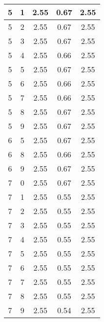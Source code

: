 \begin{longtable}{|c|c||c||c||c|}
	5 & 1 & 2.55 & 0.67 & 2.55 \\ \hline
	5 & 2 & 2.55 & 0.67 & 2.55 \\ \hline
	5 & 3 & 2.55 & 0.67 & 2.55 \\ \hline
	5 & 4 & 2.55 & 0.66 & 2.55 \\ \hline
	5 & 5 & 2.55 & 0.67 & 2.55 \\ \hline
	5 & 6 & 2.55 & 0.66 & 2.55 \\ \hline
	5 & 7 & 2.55 & 0.66 & 2.55 \\ \hline
	5 & 8 & 2.55 & 0.67 & 2.55 \\ \hline
	5 & 9 & 2.55 & 0.67 & 2.55 \\ \hline
	6 & 5 & 2.55 & 0.67 & 2.55 \\ \hline
	6 & 8 & 2.55 & 0.66 & 2.55 \\ \hline
	6 & 9 & 2.55 & 0.67 & 2.55 \\ \hline
	7 & 0 & 2.55 & 0.67 & 2.55 \\ \hline
	7 & 1 & 2.55 & 0.55 & 2.55 \\ \hline
	7 & 2 & 2.55 & 0.55 & 2.55 \\ \hline
	7 & 3 & 2.55 & 0.55 & 2.55 \\ \hline
	7 & 4 & 2.55 & 0.55 & 2.55 \\ \hline
	7 & 5 & 2.55 & 0.55 & 2.55 \\ \hline
	7 & 6 & 2.55 & 0.55 & 2.55 \\ \hline
	7 & 7 & 2.55 & 0.55 & 2.55 \\ \hline
	7 & 8 & 2.55 & 0.55 & 2.55 \\ \hline
	7 & 9 & 2.55 & 0.54 & 2.55 \\ \hline
\end{longtable}
\clearpage{}

